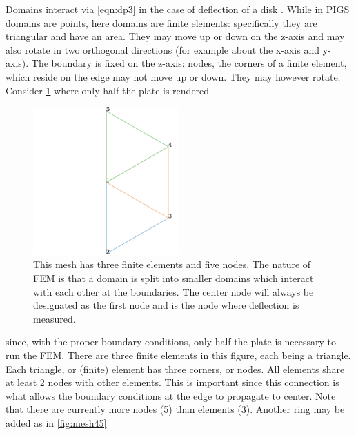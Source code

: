 \documentclass[12pt,times,twocolumn,3p]{elsarticle}
\begin{document}
Domains interact via \cref{eqn:dp3} in the case of deflection of a disk . While
in PIGS domains are points, here domains are finite elements: specifically they
are triangular and have an area. They may move up or down on the z-axis and may
also rotate in two orthogonal directions (for example about the x-axis and
y-axis). The boundary is fixed on the z-axis: nodes, the corners of a finite
element, which reside on the edge may not move up or down. They may however
rotate. Consider \cref{fig:mesh44} where only half the plate is rendered
\begin{figure}[h]
    \centering
    \includegraphics[width=0.5\textwidth]{./mesh_44.pdf}
    \caption{This mesh has three finite elements and five nodes. The nature of
    FEM is that a domain is split into smaller domains which interact with
    each other at the boundaries. The center node will always be designated as
    the first node and is the node where deflection is measured.}
    \label{fig:mesh44}
\end{figure}
since, with the proper boundary conditions, only half the plate is necessary
to run the FEM. There are three finite elements in this figure, each being
a triangle. Each triangle, or (finite) element has three corners, or nodes.
All elements share at least 2 nodes with other elements. This is important since
this connection is what allows the boundary conditions at the edge to propagate
to center. Note that there are currently more nodes (5) than elements (3).
Another ring may be added as in \cref{fig:mesh45}
\end{document}
